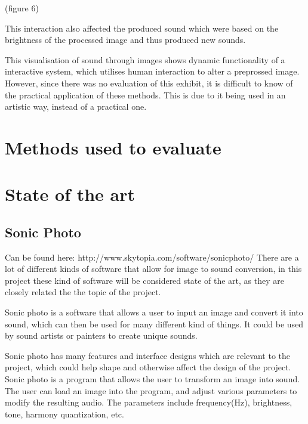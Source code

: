 (figure 6) 

This interaction also affected the produced sound which were based on the brightness of the processed image and thus produced new sounds. 

This visualisation of sound through images shows dynamic functionality of a interactive system, which utilises human interaction to alter a preprossed image. However, since there was no evaluation of this exhibit, it is difficult to know of the practical application of these methods. This is due to it being used in an artistic way, instead of a practical one.   
 

\section{Methods used to evaluate}\label{sub:methodsusedtoevaluate}


\section{State of the art}\label{sec:stateart}

\subsection{Sonic Photo}\label{sub:sonic}
Can be found here: http://www.skytopia.com/software/sonicphoto/
There are a lot of different kinds of software that allow for image to sound conversion, in this project these kind of software will be considered state of the art, as they are closely related the the topic of the project. 

Sonic photo is a software that allows a user to input an image and convert it into sound, which can then be used for many different kind of things. It could be used by sound artists or painters to create unique sounds.

Sonic photo has many features and interface designs which are relevant to the project, which could help shape and otherwise affect the design of the project.
Sonic photo is a program that allows the user to transform an image into sound. The user can load an image into the program, and adjust various parameters to modify the resulting audio. The parameters include  frequency(Hz), brightness, tone, harmony quantization, etc.


